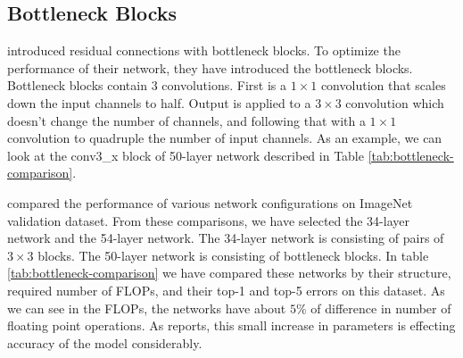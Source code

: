 \subsection{Bottleneck Blocks}
\cite{He:2015aa} introduced residual connections with bottleneck blocks. To optimize the performance of their network, they have introduced the bottleneck blocks. Bottleneck blocks contain 3 convolutions. First is a $ 1 \times 1$ convolution that scales down the input channels to half. Output is applied to a $3 \times 3$ convolution which doesn't change the number of channels, and following that with a $1 \times 1$ convolution to quadruple the number of input channels. As an example, we can look at the conv3\_x block of 50-layer network described in Table \ref{tab:bottleneck-comparison}.

\cite{He:2015aa} compared the performance of various network configurations on ImageNet validation dataset. From these comparisons, we have selected the 34-layer network and the 54-layer network. The 34-layer network is consisting of pairs of $3 \times 3$ blocks. The 50-layer network is consisting of bottleneck blocks. In table \ref{tab:bottleneck-comparison} we have compared these networks by their structure, required number of FLOPs, and their top-1 and top-5 errors on this dataset. As we can see in the FLOPs, the networks have about $5\%$ of difference in number of floating point operations. As \cite{He:2015aa} reports, this small increase in parameters is effecting accuracy of the model considerably. 

